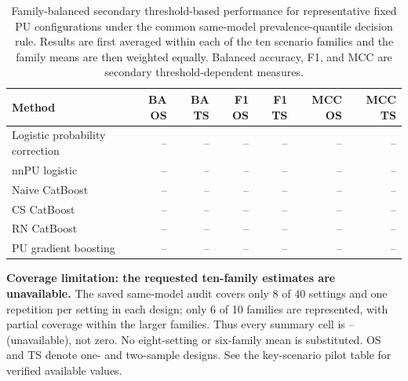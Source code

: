 \begin{table}[t]
\centering
\caption{Family-balanced secondary threshold-based performance for representative fixed PU configurations under the common same-model prevalence-quantile decision rule. Results are first averaged within each of the ten scenario families and the family means are then weighted equally. Balanced accuracy, F1, and MCC are secondary threshold-dependent measures.}
\label{tab:s-core-secondary-metrics}
\small
\setlength{\tabcolsep}{3.5pt}
\renewcommand{\arraystretch}{1.08}
\begin{tabularx}{\textwidth}{>{\raggedright\arraybackslash}X*{6}{r}}
\toprule
Method & BA OS & BA TS & F1 OS & F1 TS & MCC OS & MCC TS \\
\midrule
Logistic probability correction & -- & -- & -- & -- & -- & -- \\
nnPU logistic & -- & -- & -- & -- & -- & -- \\
Naive CatBoost & -- & -- & -- & -- & -- & -- \\
CS CatBoost & -- & -- & -- & -- & -- & -- \\
RN CatBoost & -- & -- & -- & -- & -- & -- \\
PU gradient boosting & -- & -- & -- & -- & -- & -- \\
\bottomrule
\end{tabularx}
\par\medskip
\begin{minipage}{\textwidth}\small
\textbf{Coverage limitation: the requested ten-family estimates are unavailable.} The saved same-model audit covers only 8 of 40 settings and one repetition per setting in each design; only 6 of 10 families are represented, with partial coverage within the larger families. Thus every summary cell is -- (unavailable), not zero. No eight-setting or six-family mean is substituted. OS and TS denote one- and two-sample designs. See the key-scenario pilot table for verified available values.
\end{minipage}
\end{table}
